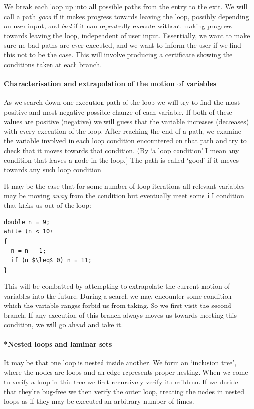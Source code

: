 \documentclass[12pt,a4paper]{article}
\begin{document}
\begin{enumerate}
We break each loop up into all possible paths from the entry to the exit. We will call a path \emph{good} if it makes progress towards leaving the loop,
possibly depending on user input, and \emph{bad} if it can repeatedly execute without making progress towards leaving the loop, independent of user input.
Essentially, we want to make sure no bad paths are ever executed, and we want to inform the user if we find this not to be the case.
This will involve producing a certificate showing the conditions taken at each branch.

\paragraph{Characterisation and extrapolation of the motion of variables}
As we search down one execution path of the loop we will try to find the most positive and most negative possible change of each variable. If both of these values
are positive (negative) we will guess that the variable increases (decreases) with every execution of the loop. After reaching the end of a path, we examine the 
variable involved in each loop condition encountered on that path and try to check that it moves towards that condition. (By `a loop condition' I mean any condition that leaves a 
node in the loop.) The path is called `good' if it moves towards any such loop condition.

It may be the case that for some number of loop iterations all relevant variables may be moving \textit{away} from the 
condition but eventually meet some \texttt{if} condition that kicks us out of the loop:
\begin{lstlisting}[frame=tlrb,language=myLang,label={lst:trickloop}, mathescape=true]
double n = 9;
while (n < 10)
{
  n = n - 1;
  if (n $\leq$ 0) n = 11;
}
\end{lstlisting}
This will be combatted by attempting to extrapolate the current motion of variables into the future. During a search we may encounter some condition
which the variable ranges forbid us from taking. So we first visit the second branch. If any execution of this branch always moves us towards meeting
this condition, we will go ahead and take it.

\paragraph{*Nested loops and laminar sets}
It may be that one loop is nested inside another. We form an `inclusion tree', where the nodes are loops and an edge represents proper nesting. When we come to verify a loop in this tree we first recursively verify its children.
If we decide that they're bug-free we then verify the outer loop, treating the nodes in nested loops as if they may be executed an arbitrary number of times.


\end{enumerate}
\end{document}
